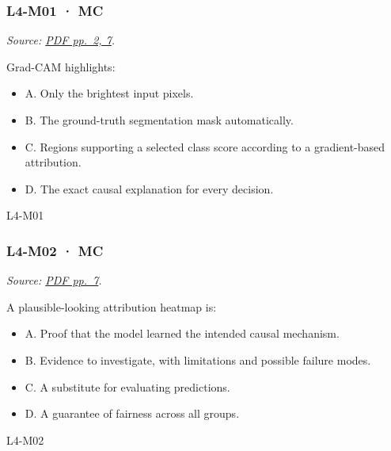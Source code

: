\noindent\begin{minipage}{\linewidth}

\subsubsection{L4-M01 · MC}\label{l4-m01-mc}

\emph{Source:
\href{../Lab\%20Sessions/Lab4/manolo_presentation.pdf\#page=2}{PDF
pp.~2, 7}.}

Grad-CAM highlights:

\begin{itemize}
\tightlist
\item
  A. Only the brightest input pixels.
\item
  B. The ground-truth segmentation mask automatically.
\item
  C. Regions supporting a selected class score according to a
  gradient-based attribution.
\item
  D. The exact causal explanation for every decision.
\end{itemize}

\begin{solution}[8mm]{L4-M01}

\end{solution}
\end{minipage}\par\medskip

\noindent\begin{minipage}{\linewidth}

\subsubsection{L4-M02 · MC}\label{l4-m02-mc}

\emph{Source:
\href{../Lab\%20Sessions/Lab4/manolo_presentation.pdf\#page=7}{PDF
pp.~7}.}

A plausible-looking attribution heatmap is:

\begin{itemize}
\tightlist
\item
  A. Proof that the model learned the intended causal mechanism.
\item
  B. Evidence to investigate, with limitations and possible failure
  modes.
\item
  C. A substitute for evaluating predictions.
\item
  D. A guarantee of fairness across all groups.
\end{itemize}

\begin{solution}[8mm]{L4-M02}

\end{solution}
\end{minipage}\par\medskip


